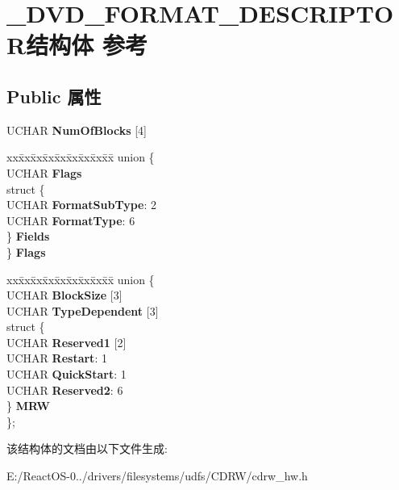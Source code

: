 \hypertarget{struct___d_v_d___f_o_r_m_a_t___d_e_s_c_r_i_p_t_o_r}{}\section{\+\_\+\+D\+V\+D\+\_\+\+F\+O\+R\+M\+A\+T\+\_\+\+D\+E\+S\+C\+R\+I\+P\+T\+O\+R结构体 参考}
\label{struct___d_v_d___f_o_r_m_a_t___d_e_s_c_r_i_p_t_o_r}
\subsection*{Public 属性}
\begin{DoxyCompactItemize}
\item 
\mbox{\label{struct___d_v_d___f_o_r_m_a_t___d_e_s_c_r_i_p_t_o_r_a74f75d39e69cfc7b544c8c7500768764}} 
U\+C\+H\+AR {\bfseries Num\+Of\+Blocks} \mbox{[}4\mbox{]}
\item 
\mbox{\label{struct___d_v_d___f_o_r_m_a_t___d_e_s_c_r_i_p_t_o_r_ab3692935e7b50235bb30fe9f95a78ba2}} 
\begin{tabbing}
xx\=xx\=xx\=xx\=xx\=xx\=xx\=xx\=xx\=\kill
union \{\\
\>UCHAR {\bfseries Flags}\\
\>struct \{\\
\>\>UCHAR {\bfseries FormatSubType}: 2\\
\>\>UCHAR {\bfseries FormatType}: 6\\
\>\} {\bfseries Fields}\\
\} {\bfseries Flags}\\

\end{tabbing}\item 
\mbox{\label{struct___d_v_d___f_o_r_m_a_t___d_e_s_c_r_i_p_t_o_r_a3a1093892e6004d585dc38042dee3f6e}} 
\begin{tabbing}
xx\=xx\=xx\=xx\=xx\=xx\=xx\=xx\=xx\=\kill
union \{\\
\>UCHAR {\bfseries BlockSize} \mbox{[}3\mbox{]}\\
\>UCHAR {\bfseries TypeDependent} \mbox{[}3\mbox{]}\\
\>struct \{\\
\>\>UCHAR {\bfseries Reserved1} \mbox{[}2\mbox{]}\\
\>\>UCHAR {\bfseries Restart}: 1\\
\>\>UCHAR {\bfseries QuickStart}: 1\\
\>\>UCHAR {\bfseries Reserved2}: 6\\
\>\} {\bfseries MRW}\\
\}; \\

\end{tabbing}\end{DoxyCompactItemize}


该结构体的文档由以下文件生成\+:\begin{DoxyCompactItemize}
\item 
E\+:/\+React\+O\+S-\/0../drivers/filesystems/udfs/\+C\+D\+R\+W/cdrw\+\_\+hw.\+h\end{DoxyCompactItemize}
